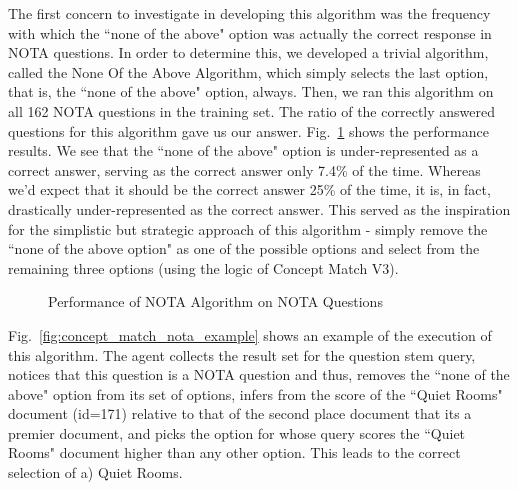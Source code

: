 The first concern to investigate in developing this algorithm was the frequency with which the ``none of the above" option was actually the correct response in NOTA questions.  In order to determine this, we developed a trivial algorithm, called the None Of the Above Algorithm, which simply selects the last option, that is, the ``none of the above" option, always.  Then, we ran this algorithm on all 162 NOTA questions in the training set.  The ratio of the correctly answered questions for this algorithm gave us our answer.  Fig.~\ref{fig:nota_training_set_performance} shows the performance results.  We see that the ``none of the above" option is under-represented as a correct answer, serving as the correct answer only 7.4\% of the time.  Whereas we'd expect that it should be the correct answer 25\% of the time, it is, in fact, drastically under-represented as the correct answer.  This served as the inspiration for the simplistic but strategic approach of this algorithm - simply remove the ``none of the above option" as one of the possible options and select from the remaining three options (using the logic of Concept Match V3).

\begin{figure}
\centering
\vspace{0.75in}
\caption{Performance of NOTA Algorithm on NOTA Questions}
\label{fig:nota_training_set_performance}
\end{figure}


Fig.~\ref{fig:concept_match_nota_example} shows an example of the execution of this algorithm.  The agent collects the result set for the question stem query, notices that this question is a NOTA question and thus, removes the ``none of the above" option from its set of options, infers from the score of the ``Quiet Rooms" document (id=171) relative to that of the second place document that its a premier document, and picks the option for whose query scores the ``Quiet Rooms" document higher than any other option.  This leads to the correct selection of a) Quiet Rooms.


